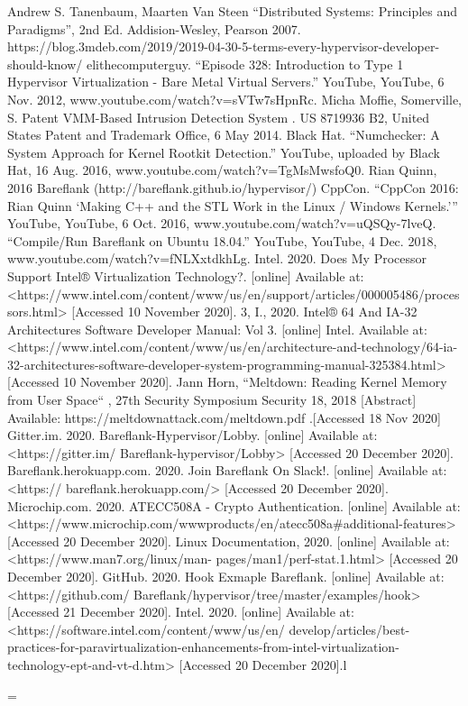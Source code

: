 ﻿\documentclass[10pt,a4paper,twocolumn,twoside]{article}
\begin{document}
\begin{thebibliography}{11}
 Andrew S. Tanenbaum, Maarten Van Steen “Distributed Systems: Principles and Paradigms”, 2nd Ed. Addision-Wesley, Pearson 2007. 
 https://blog.3mdeb.com/2019/2019-04-30-5-terms-every-hypervisor-developer-should-know/
 elithecomputerguy. “Episode 328: Introduction to Type 1 Hypervisor Virtualization - Bare Metal Virtual Servers.” YouTube, YouTube, 6 Nov. 2012, www.youtube.com/watch?v=sVTw7sHpnRc.
 Micha Moffie, Somerville, S. Patent VMM-Based Intrusion Detection System . US 8719936 B2, United States Patent and Trademark Office, 6 May 2014.
 Black Hat. “Numchecker: A System Approach for Kernel Rootkit Detection.” YouTube, uploaded by Black Hat, 16 Aug. 2016, www.youtube.com/watch?v=TgMsMwsfoQ0.
 Rian Quinn, 2016 Bareflank (http://bareflank.github.io/hypervisor/)
 CppCon. “CppCon 2016: Rian Quinn ‘Making C++ and the STL Work in the Linux / Windows Kernels.’” YouTube, YouTube, 6 Oct. 2016, www.youtube.com/watch?v=uQSQy-7lveQ.
 “Compile/Run Bareflank on Ubuntu 18.04.” YouTube, YouTube, 4 Dec. 2018, www.youtube.com/watch?v=fNLXxtdkhLg.
 Intel. 2020. Does My Processor Support Intel® Virtualization Technology?. [online] Available at: <https://www.intel.com/content/www/us/en/support/articles/000005486/processors.html> [Accessed 10 November 2020].
 3, I., 2020. Intel® 64 And IA-32 Architectures Software Developer Manual: Vol 3. [online] Intel. Available at: <https://www.intel.com/content/www/us/en/architecture-and-technology/64-ia-32-architectures-software-developer-system-programming-manual-325384.html> [Accessed 10 November 2020].
 Jann Horn, “Meltdown: Reading Kernel Memory from User Space“ , 27th Security Symposium Security 18, 2018 [Abstract] Available: https://meltdownattack.com/meltdown.pdf .[Accessed 18 Nov 2020]
 Gitter.im. 2020. Bareflank-Hypervisor/Lobby. [online] Available at: <https://gitter.im/ Bareflank-hypervisor/Lobby> [Accessed 20 December 2020].
 Bareflank.herokuapp.com. 2020. Join Bareflank On Slack!. [online] Available at: <https:// bareflank.herokuapp.com/> [Accessed 20 December 2020].
 Microchip.com. 2020. ATECC508A - Crypto Authentication. [online] Available at: <https://www.microchip.com/wwwproducts/en/atecc508a#additional-features> [Accessed 20 December 2020].
 Linux Documentation, 2020. [online] Available at: <https://www.man7.org/linux/man- pages/man1/perf-stat.1.html> [Accessed 20 December 2020].
 GitHub. 2020. Hook Exmaple Bareflank. [online] Available at: <https://github.com/ Bareflank/hypervisor/tree/master/examples/hook> [Accessed 21 December 2020].
 Intel. 2020. [online] Available at: <https://software.intel.com/content/www/us/en/ develop/articles/best-practices-for-paravirtualization-enhancements-from-intel-virtualization- technology-ept-and-vt-d.htm> [Accessed 20 December 2020].l

=


\end{thebibliography}
\end{document}
